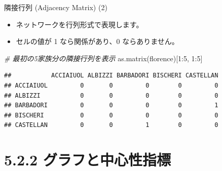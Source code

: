 \documentclass[
  ignorenonframetext,
]{beamer}
\newenvironment{Shaded}{\begin{snugshade}}{\end{snugshade}}
\newcommand{\CommentTok}[1]{\textcolor[rgb]{0.56,0.35,0.01}{\textit{#1}}}
\newcommand{\DecValTok}[1]{\textcolor[rgb]{0.00,0.00,0.81}{#1}}
\newcommand{\FunctionTok}[1]{\textcolor[rgb]{0.00,0.00,0.00}{#1}}
\newcommand{\NormalTok}[1]{#1}
\newcommand{\SpecialCharTok}[1]{\textcolor[rgb]{0.00,0.00,0.00}{#1}}
\providecommand{\tightlist}{%
  \setlength{\itemsep}{0pt}\setlength{\parskip}{0pt}}
\begin{document}
\begin{frame}[fragile]{隣接行列 (Adjacency Matrix) (2)}
\protect\hypertarget{ux96a3ux63a5ux884cux5217-adjacency-matrix-2}{}
\begin{itemize}
\tightlist
\item
  ネットワークを行列形式で表現します。
\item
  セルの値が 1 なら関係があり、0 ならありません。
\end{itemize}

\scriptsize

\begin{Shaded}
\begin{Highlighting}[]
\CommentTok{\# 最初の5家族分の隣接行列を表示}
\FunctionTok{as.matrix}\NormalTok{(florence)[}\DecValTok{1}\SpecialCharTok{:}\DecValTok{5}\NormalTok{, }\DecValTok{1}\SpecialCharTok{:}\DecValTok{5}\NormalTok{]}
\end{Highlighting}
\end{Shaded}

\begin{verbatim}
##           ACCIAIUOL ALBIZZI BARBADORI BISCHERI CASTELLAN
## ACCIAIUOL         0       0         0        0         0
## ALBIZZI           0       0         0        0         0
## BARBADORI         0       0         0        0         1
## BISCHERI          0       0         0        0         0
## CASTELLAN         0       0         1        0         0
\end{verbatim}

\normalsize
\end{frame}

\hypertarget{ux30b0ux30e9ux30d5ux3068ux4e2dux5fc3ux6027ux6307ux6a19}{%
\section{5.2.2
グラフと中心性指標}\label{ux30b0ux30e9ux30d5ux3068ux4e2dux5fc3ux6027ux6307ux6a19}}
\end{document}
